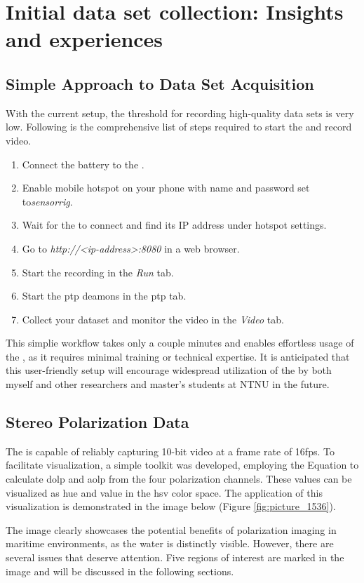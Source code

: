 \chapter{Initial data set collection: Insights and experiences}
\label{chap:results}

\section{Simple Approach to Data Set Acquisition}
With the current setup, the threshold for recording high-quality data sets is very low.
Following is the comprehensive list of steps required to start the \sr and record video.
\begin{enumerate}
    \item Connect the battery to the \jx.
    \item Enable mobile hotspot on your phone with name and password set to\textit{sensorrig}.
    \item Wait for the \sr to connect and find its IP address under hotspot settings.
    \item Go to \textit{http://<ip-address>:8080} in a web browser.
    \item Start the recording in the \textit{Run} tab.
    \item Start the \gls{ptp} deamons in the \gls{ptp} tab.
    \item Collect your dataset and monitor the video in the \textit{Video} tab.
\end{enumerate}
This simplie workflow takes only a couple minutes and enables effortless usage of the \sr, as it requires minimal training or technical expertise.
It is anticipated that this user-friendly setup will encourage widespread utilization of the \sr by both myself and other researchers and master's students at NTNU in the future.


\section{Stereo Polarization Data}
The \sr is capable of reliably capturing 10-bit video at a frame rate of 16fps.
To facilitate visualization, a simple toolkit was developed, employing the Equation \todo to calculate \gls{dolp} and \gls{aolp} from the four polarization channels.
These values can be visualized as hue and value in the \gls{hsv} color space.
The application of this visualization is demonstrated in the image below (Figure \ref{fig:picture_1536}).

The image clearly showcases the potential benefits of polarization imaging in maritime environments, as the water is distinctly visible.
However, there are several issues that deserve attention.
Five regions of interest are marked in the image and will be discussed in the following sections.

